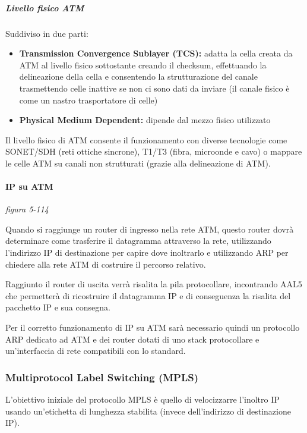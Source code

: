 \documentclass[
]{article}
\begin{document}
\hypertarget{header-n395}{%
\subparagraph{Livello fisico ATM}\label{header-n395}}

Suddiviso in due parti:

\begin{itemize}
\item
  \textbf{Transmission Convergence Sublayer (TCS):} adatta la cella
  creata da ATM al livello fisico sottostante creando il checksum,
  effettuando la delineazione della cella e consentendo la
  strutturazione del canale trasmettendo celle inattive se non ci sono
  dati da inviare (il canale fisico è come un nastro trasportatore di
  celle)
\item
  \textbf{Physical Medium Dependent:} dipende dal mezzo fisico
  utilizzato
\end{itemize}

Il livello fisico di ATM consente il funzionamento con diverse
tecnologie come SONET/SDH (reti ottiche sincrone), T1/T3 (fibra,
microonde e cavo) o mappare le celle ATM su canali non strutturati
(grazie alla delineazione di ATM).

\hypertarget{header-n403}{%
\paragraph{IP su ATM}\label{header-n403}}

\emph{figura 5-114}

Quando si raggiunge un router di ingresso nella rete ATM, questo router
dovrà determinare come trasferire il datagramma attraverso la rete,
utilizzando l'indirizzo IP di destinazione per capire dove inoltrarlo e
utilizzando ARP per chiedere alla rete ATM di costruire il percorso
relativo.

Raggiunto il router di uscita verrà risalita la pila protocollare,
incontrando AAL5 che permetterà di ricostruire il datagramma IP e di
conseguenza la risalita del pacchetto IP e sua consegna.

Per il corretto funzionamento di IP su ATM sarà necessario quindi un
protocollo ARP dedicato ad ATM e dei router dotati di uno stack
protocollare e un'interfaccia di rete compatibili con lo standard.

\hypertarget{header-n408}{%
\subsubsection{Multiprotocol Label Switching (MPLS)}\label{header-n408}}

L'obiettivo iniziale del protocollo MPLS è quello di velocizzarre
l'inoltro IP usando un'etichetta di lunghezza stabilita (invece
dell'indirizzo di destinazione IP).
\end{document}
